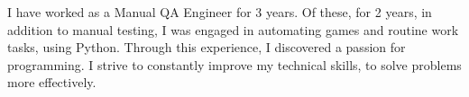 \documentclass[a4paper, 12pt]{article}
\begin{document}
I have worked as a Manual QA Engineer for 3 years.
Of these, for 2 years, in addition to manual testing,
I was engaged in automating games and routine work tasks, using Python.
Through this experience, I discovered a passion for programming.
I strive to constantly improve my technical skills, to solve problems more effectively.
\end{document}

